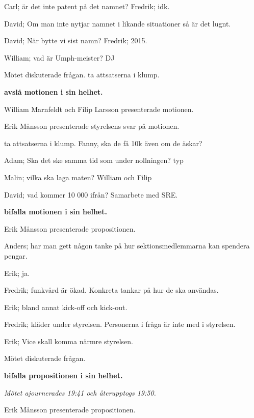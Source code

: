 \documentclass[10pt]{article}
\begin{document}
\begin{paragrafer}
\begin{paragrafer}
        Carl; är det inte patent på det namnet? Fredrik; idk.

        David; Om man inte nytjar namnet i likande situationer så är det lugnt.

        David; När bytte vi sist namn? Fredrik; 2015.

        William; vad är Umph-meister? DJ

        Mötet diskuterade frågan.
        \Mba ta attsatserna i klump.

        \textbf{\Mba avslå motionen i sin helhet.}

        William Marnfeldt och Filip Larsson presenterade motionen.

        Erik Månsson presenterade styrelsens svar på motionen.

        \Mba ta attsatserna i klump.
        Fanny, ska de få 10k även om de äskar?

        Adam; Ska det ske samma tid som under nollningen? typ

        Malin; vilka ska laga maten?  William och Filip

        David; vad kommer 10 000 ifrån? Samarbete med SRE.

        \textbf{\Mba bifalla motionen i sin helhet.}

    \end{paragrafer}
    \begin{paragrafer}
        Erik Månsson presenterade propositionen.

        Anders; har man gett någon tanke på hur sektionsmedlemmarna kan spendera pengar.

        Erik; ja.

        Fredrik; funkvård är ökad. Konkreta tankar på hur de ska användas.

        Erik; bland annat kick-off och kick-out.

        Fredrik; kläder under styrelsen. Personerna i fråga är inte med i styrelsen.

        Erik; Vice skall komma närmre styrelsen.

        Mötet diskuterade frågan.

        \textbf{\Mba bifalla propositionen i sin helhet.}

        \emph{Mötet ajournerades 19:41 och återupptogs 19:50.}

        Erik Månsson presenterade propositionen.


\end{paragrafer}
\end{paragrafer}
\end{document}
